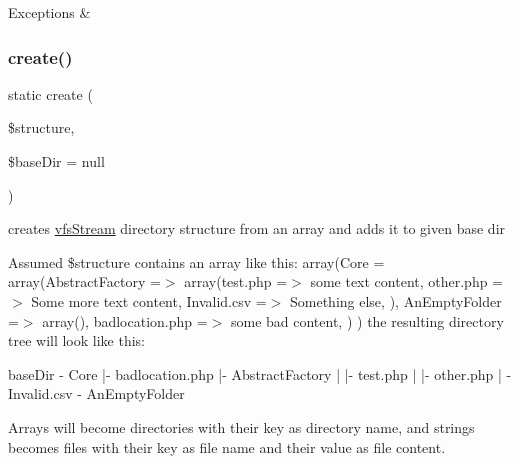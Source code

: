 \begin{DoxyExceptions}{Exceptions}
{\em } & \\
\hline
\end{DoxyExceptions}
\mbox{\label{classorg_1_1bovigo_1_1vfs_1_1vfs_stream_a96a1398a02095ca9ce344c24e3beaf15}} 
\subsubsection{\texorpdfstring{create()}{create()}}
{\footnotesize\ttfamily static create (\begin{DoxyParamCaption}\item[{array}]{\$structure,  }\item[{\mbox{\hyperlink{classorg_1_1bovigo_1_1vfs_1_1vfs_stream_directory}{vfs\+Stream\+Directory}}}]{\$base\+Dir = {\ttfamily null} }\end{DoxyParamCaption})\hspace{0.3cm}{\ttfamily [static]}}

creates \mbox{\hyperlink{classorg_1_1bovigo_1_1vfs_1_1vfs_stream}{vfs\+Stream}} directory structure from an array and adds it to given base dir

Assumed \$structure contains an array like this\+: {\ttfamily  array(\textquotesingle{}Core\textquotesingle{} = array(\textquotesingle{}Abstract\+Factory\textquotesingle{} =$>$ array(\textquotesingle{}test.\+php\textquotesingle{} =$>$ \textquotesingle{}some text content\textquotesingle{}, \textquotesingle{}other.\+php\textquotesingle{} =$>$ \textquotesingle{}Some more text content\textquotesingle{}, \textquotesingle{}Invalid.\+csv\textquotesingle{} =$>$ \textquotesingle{}Something else\textquotesingle{}, ), \textquotesingle{}An\+Empty\+Folder\textquotesingle{} =$>$ array(), \textquotesingle{}badlocation.\+php\textquotesingle{} =$>$ \textquotesingle{}some bad content\textquotesingle{}, ) ) } the resulting directory tree will look like this\+: 
\begin{DoxyPre}
baseDir
-\/ Core
 |- badlocation.php
 |- AbstractFactory
 | |- test.php
 | |- other.php
 | -\/ Invalid.csv
 -\/ AnEmptyFolder
\end{DoxyPre}
 Arrays will become directories with their key as directory name, and strings becomes files with their key as file name and their value as file content.

